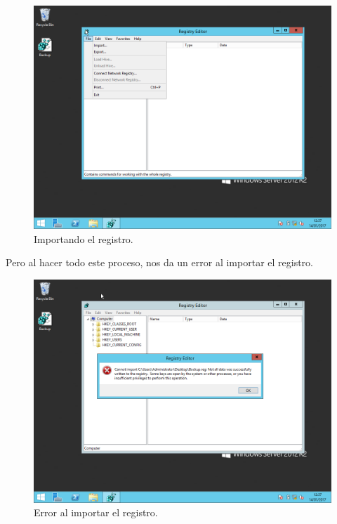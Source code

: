 \begin{figure}[H]
	\begin{center}
		\includegraphics[width=15cm]{Imagenes/Importacion_registro}
		\caption{Importando el registro.}
		\label{fig:7}
	\end{center}
\end{figure}

Pero al hacer todo este proceso, nos da un error al importar el registro.
\begin{figure}[H]
	\begin{center}
		\includegraphics[width=15cm]{Imagenes/Error_importacion}
		\caption{Error al importar el registro.}
		\label{fig:8}
	\end{center}
\end{figure}

